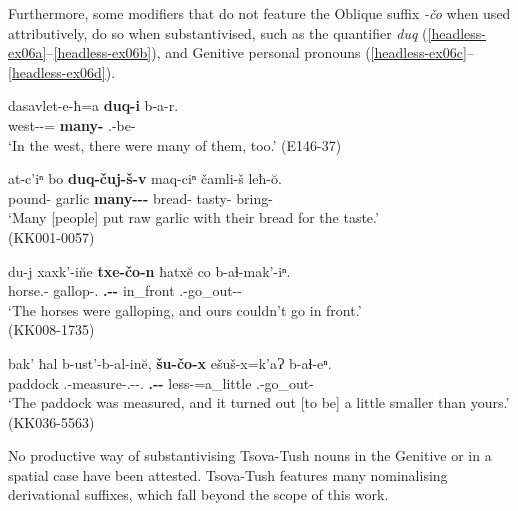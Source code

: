 Furthermore, some modifiers that do not feature the Oblique suffix \textit{-čo} when used attributively, do so when substantivised, such as the quantifier \textit{duq} (\ref{headless-ex06a}--\ref{headless-ex06b}), and Genitive personal pronouns (\ref{headless-ex06c}--\ref{headless-ex06d}).



\begin{exe}
	\ex\label{headless-ex06}
	\begin{xlist}
		
		\ex\label{headless-ex06a}
		\gll dasavlet-e-ħ=a \textbf{duq-i} b-a-r. \\
		west-{\Obl}-{\Ess}={\Add} \textbf{many-{\Pl}} {\M}.{\Pl}-be-{\Imprf} \\
		\trans `In the west, there were many of them, too.'
		\hfill (E146-37)
		
		\ex\label{headless-ex06b}
		\gll at-c'iⁿ bo \textbf{duq-čuj-š-v} maq-ciⁿ čamli-š leħ-\u{o}. \\
		pound-{\Priv} garlic \textbf{many-{\Obl}-{\Pl}-{\Erg}} bread-{\Apudess} tasty-{\Adv} bring-{\Npst} \\
		\trans `Many [people] put raw garlic with their bread for the taste.' \\
		\hfill (KK001-0057)
		
		\ex\label{headless-ex06c}
		\gll du-j xaxk'-in\u{}e \textbf{txe-čo-n} ħatx\u{e} co b-aɬ-mak'-iⁿ. \\
		horse.{\Obl}-{\Pl} gallop-{\Aor}.{\Seq} \textbf{{\Fpl}.{\Gen}-{\Obl}-{\Dat}} in\_front {\Neg} {\B}.{\Sg}-go\_out-{\Pot}-{\Aor} \\
		\trans `The horses were galloping, and ours couldn't go in front.'  \\
		\hfill (KK008-1735)
		
		\ex\label{headless-ex06d}
		\gll bak' ħal b-ust'-b-al-in\u{e}, \textbf{šu-čo-x} ešuš-x=k'aɁ b-aɬ-eⁿ. \\
		paddock {\Pv} {\B}.{\Sg}-measure-{\B}.{\Sg}-{\Intr}-{\Aor}.{\Seq} \textbf{{\Spl}.{\Gen}-{\Obl}-{\Cont}} less-{\Cmp}=a\_little {\B}.{\Sg}-go\_out-{\Aor} \\
		\trans `The paddock was measured, and it turned out [to be] a little smaller than yours.'
		\hfill (KK036-5563)
		
	\end{xlist}
\end{exe}

No productive way of substantivising Tsova-Tush nouns in the Genitive or in a spatial case have been attested. Tsova-Tush features many nominalising derivational suffixes, which fall beyond the scope of this work.




